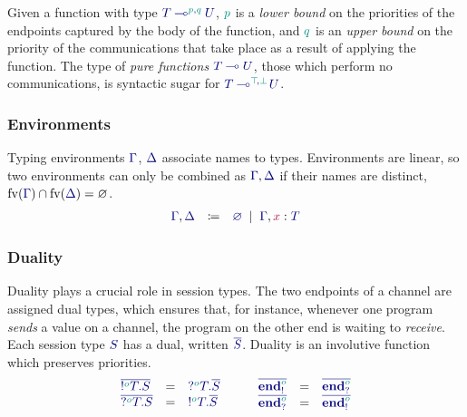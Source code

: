 \documentclass[main.tex]{subfiles}
\begin{document}
Given a function with type $\ty{\tylolli[\cs{p},\cs{q}]{T}{U}}$, $\cs{p}$ is a \emph{lower bound} on the priorities of the endpoints captured by the body of the function, and $\cs{q}$ is an \emph{upper bound} on the priority of the communications that take place as a result of applying the function. The type of \emph{pure functions} $\ty{\tylolli{T}{U}}$, \ie those which perform no communications, is syntactic sugar for $\ty{\tylolli[\cs{\ptop},\cs{\pbot}]{T}{U}}$.

\subsubsection*{Environments}
Typing environments $\ty{\Gamma}$, $\ty{\Delta}$ associate names to types. Environments are linear, so two environments can only be combined as $\ty{\Gamma}, \ty{\Delta}$ if their names are distinct, \ie $\fv(\ty{\Gamma})\cap\fv(\ty{\Delta})=\varnothing$.
\[
\begin{array}{lcl}
  \ty{\Gamma}, \ty{\Delta}
  & \coloneqq & \ty{\emptyenv}
    \sep        \ty{\Gamma}, \tmty{x}{T}
\end{array}
\]

\subsubsection*{Duality}
Duality plays a crucial role in session types. The two endpoints of a channel are assigned dual types, which ensures that, for instance, whenever one program \emph{sends} a value on a channel, the program on the other end is waiting to \emph{receive}. Each session type $\ty{S}$ has a dual, written $\ty{\co{S}}$. Duality is an involutive function which preserves priorities.
\[
\begin{array}{lcl}
  \ty{\co{\tysend[\cs{o}]{T}{S}}} & = & \ty{\tyrecv[\cs{o}]{T}{\co{S}}} \\
  \ty{\co{\tyrecv[\cs{o}]{T}{S}}} & = & \ty{\tysend[\cs{o}]{T}{\co{S}}}
\end{array}
\qquad
\begin{array}{lcl}
  \ty{\co{\tyends[\cs{o}]}} & = & \ty{\co{\tyendr[\cs{o}]}} \\
  \ty{\co{\tyendr[\cs{o}]}} & = & \ty{\co{\tyends[\cs{o}]}}
\end{array}
\]
\end{document}

